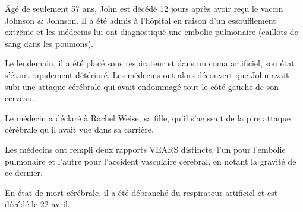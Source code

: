 Âgé de seulement 57 ans, John est décédé 12 jours après avoir reçu le vaccin
Johnson \& Johnson. Il a été admis à l'hôpital en raison d'un essoufflement
extrême et les médecins lui ont diagnostiqué une embolie pulmonaire (caillots de
sang dans les poumons).

Le lendemain, il a été placé sous respirateur et dans un coma artificiel, son
état s'étant rapidement détérioré. Les médecins ont alors découvert que John
avait subi une attaque cérébrale qui avait endommagé tout le côté gauche de son
cerveau.

Le médecin a déclaré à Rachel Weise, sa fille, qu'il s'agissait de la pire
attaque cérébrale qu'il avait vue dans sa carrière.

Les médecins ont rempli deux rapports VEARS distincts, l'un pour l'embolie
pulmonaire et l'autre pour l'accident vasculaire cérébral, en notant la gravité
de ce dernier.

En état de mort cérébrale, il a été débranché du respirateur artificiel et est
décédé le 22 avril.

